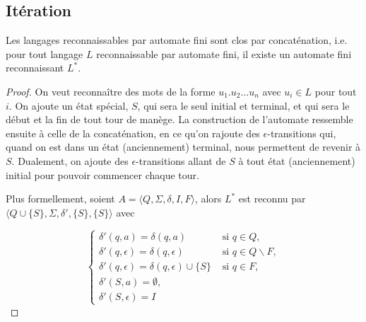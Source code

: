 \subsection{Itération}
\label{clotiter}

\begin{theorem}
Les langages reconnaissables par automate fini sont clos par concaténation, i.e. pour tout langage $L$ reconnaissable par automate fini, il existe un automate fini reconnaissant $L^*$.
\end{theorem}

\begin{proof}

On veut reconnaître des mots de la forme $u_1.u_2...u_n$ avec $u_i \in L$ pour tout $i$. On ajoute un état spécial, $S$, qui sera le seul initial et terminal, et qui sera le début et la fin de tout tour de manège. La construction de l'automate ressemble ensuite à celle de la concaténation, en ce qu'on rajoute des $\epsilon$-transitions qui, quand on est dans un état (anciennement) terminal, nous permettent de revenir à $S$. Dualement, on ajoute des $\epsilon$-transitions allant de $S$ à tout état (anciennement) initial pour pouvoir commencer chaque tour.

Plus formellement, soient $A = \big \langle Q, \Sigma, \delta, I, F\big \rangle$, alors $L^*$ est reconnu par $\big \langle Q \cup \{S\}, \Sigma, \delta', \{S\}, \{S\} \big \rangle$ avec 

\[
\begin{cases}
\delta'(q,a) = \delta(q,a) &\text{ si } q \in Q,\\[1ex]
\delta'(q,\epsilon) = \delta(q,\epsilon) &\text{ si } q \in Q \backslash F,\\[1ex]
\delta'(q,\epsilon) = \delta(q,\epsilon) \cup \{S\} &\text{ si } q \in F,\\[1ex]
\delta'(S,a) = \emptyset, &\\[1ex]
\delta'(S,\epsilon) = I &
\end{cases}
\]

\end{proof}

